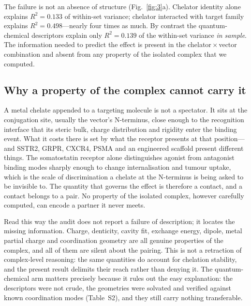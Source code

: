 The failure is not an absence of structure (Fig.~\ref{fig:3}a). Chelator identity alone explains $R^2 = 0.133$ of within-set variance; chelator interacted with target family explains $R^2 = 0.498$---nearly four times as much. By contrast the quantum-chemical descriptors explain only $R^2 = 0.139$ of the within-set variance \emph{in sample}. The information needed to predict the effect is present in the chelator\,$\times$\,vector combination and absent from any property of the isolated complex that we computed.

\subsection{Why a property of the complex cannot carry it}

A metal chelate appended to a targeting molecule is not a spectator. It sits at the conjugation site, usually the vector's N-terminus, close enough to the recognition interface that its steric bulk, charge distribution and rigidity enter the binding event. What it costs there is set by what the receptor presents at that position---and SSTR2, GRPR, CXCR4, PSMA and an engineered scaffold present different things. The somatostatin receptor alone distinguishes agonist from antagonist binding modes sharply enough to change internalisation and tumour uptake,\cite{Zhu2024SSTRanta,Zhang2024JR11} which is the scale of discrimination a chelate at the N-terminus is being asked to be invisible to. The quantity that governs the effect is therefore a contact, and a contact belongs to a pair. No property of the isolated complex, however carefully computed, can encode a partner it never meets.

Read this way the audit does not report a failure of description; it locates the missing information. Charge, denticity, cavity fit, exchange energy, dipole, metal partial charge and coordination geometry are all genuine properties of the complex, and all of them are silent about the pairing. This is not a retraction of complex-level reasoning: the same quantities do account for chelation stability,\cite{Kim2026ChelatorDFT} and the present result delimits their reach rather than denying it. The quantum-chemical arm matters precisely because it rules out the easy explanation: the descriptors were not crude, the geometries were solvated and verified against known coordination modes (Table~S2), and they still carry nothing transferable.

